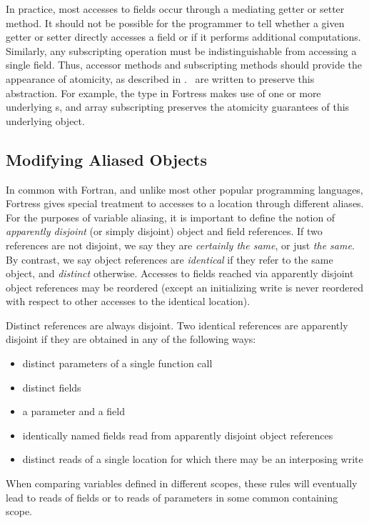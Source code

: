 In practice, most accesses to fields occur through a mediating getter
or setter method.  It should not be possible for the programmer to
tell whether a given getter or setter directly accesses a field or if
it performs additional computations.  Similarly, any subscripting
operation must be indistinguishable from accessing a single field.
Thus, accessor methods and subscripting methods should provide the
appearance of atomicity, as described in .
\Library\ are written to preserve this abstraction.  For
example, the  type in Fortress makes use of one or more
underlying s, and array subscripting
preserves the atomicity guarantees of this underlying object.

\subsection{Modifying Aliased Objects}

In common with Fortran, and unlike most other popular programming
languages, Fortress gives special treatment to accesses to a location
through different aliases.  For the purposes of variable aliasing, it
is important to define the notion of \emph{apparently disjoint} (or
simply disjoint) object and field references.  If two references are not
disjoint, we say they are \emph{certainly the same}, or just \emph{the
  same}.  By contrast, we say object references are \emph{identical}
if they refer to the same object, and \emph{distinct} otherwise.
Accesses to fields reached via apparently disjoint object references
may be reordered (except an initializing write is never reordered with
respect to other accesses to the identical location).



Distinct references are always disjoint.  Two identical
references are apparently disjoint if they are obtained in any of the
following ways:
\begin{itemize}
\item distinct parameters of a single function call
\item distinct fields
\item a parameter and a field
\item identically named fields read from apparently disjoint object references
\item distinct reads of a single location for which there may be an
  interposing write
\end{itemize}
When comparing variables defined in different scopes, these rules will
eventually lead to reads of fields or to reads of parameters in some
common containing scope.

